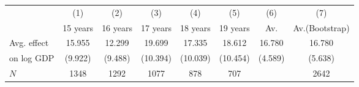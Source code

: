 \begin{tabular}{l*{7}{c}}
\hline\hline
            &\multicolumn{1}{c}{(1)}&\multicolumn{1}{c}{(2)}&\multicolumn{1}{c}{(3)}&\multicolumn{1}{c}{(4)}&\multicolumn{1}{c}{(5)}&\multicolumn{1}{c}{(6)}&\multicolumn{1}{c}{(7)}\\
            &    15 years&    16 years&    17 years&    18 years&    19 years&         Av.&Av.(Bootstrap)\\
\hline
Avg. effect &      15.955&      12.299&      19.699&      17.335&      18.612&      16.780&      16.780\\
on log GDP  &     (9.922)&     (9.488)&    (10.394)&    (10.039)&    (10.454)&     (4.589)&     (5.638)\\
\hline
\(N\)       &        1348&        1292&        1077&         878&         707&            &        2642\\
\hline\hline
\end{tabular}

